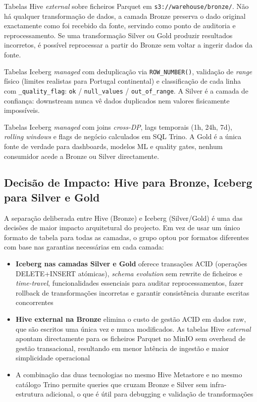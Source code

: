\documentclass[11pt,a4paper]{article}
\begin{document}
\begin{description}[style=nextline,leftmargin=0pt,labelwidth=0pt]
  \item[\textbf{Bronze}] Tabelas Hive \textit{external} sobre ficheiros Parquet em \texttt{s3://warehouse/bronze/}. Não há qualquer transformação de dados, a camada Bronze preserva o dado original exactamente como foi recebido da fonte, servindo como ponto de auditoria e reprocessamento. Se uma transformação Silver ou Gold produzir resultados incorretos, é possível reprocessar a partir do Bronze sem voltar a ingerir dados da fonte.
  \item[\textbf{Silver}] Tabelas Iceberg \textit{managed} com deduplicação via \texttt{ROW\_NUMBER()}, validação de \textit{range} físico (limites realistas para Portugal continental) e classificação de cada linha com \texttt{\_quality\_flag}: \texttt{ok} / \texttt{null\_values} / \texttt{out\_of\_range}. A Silver é a camada de confiança: downstream nunca vê dados duplicados nem valores fisicamente impossíveis.
  \item[\textbf{Gold}] Tabelas Iceberg \textit{managed} com joins \textit{cross-DP}, lags temporais (1h, 24h, 7d), \textit{rolling windows} e flags de negócio calculados em SQL Trino. A Gold é a única fonte de verdade para dashboards, modelos ML e quality gates, nenhum consumidor acede a Bronze ou Silver directamente.
\end{description}

\subsection{Decisão de Impacto: Hive para Bronze, Iceberg para Silver e Gold}

A separação deliberada entre Hive (Bronze) e Iceberg (Silver/Gold) é uma das decisões de maior impacto arquitetural do projecto. Em vez de usar um único formato de tabela para todas as camadas, o grupo optou por formatos diferentes com base nas garantias necessárias em cada camada:

\begin{itemize}[leftmargin=*,noitemsep]
  \item \textbf{Iceberg nas camadas Silver e Gold} oferece transações ACID (operações DELETE+INSERT atómicas), \textit{schema evolution} sem rewrite de ficheiros e \textit{time-travel}, funcionalidades essenciais para auditar reprocessamentos, fazer rollback de transformações incorretas e garantir consistência durante escritas concorrentes
  \item \textbf{Hive external na Bronze} elimina o custo de gestão ACID em dados raw, que são escritos uma única vez e nunca modificados. As tabelas Hive \textit{external} apontam directamente para os ficheiros Parquet no MinIO sem overhead de gestão transacional, resultando em menor latência de ingestão e maior simplicidade operacional
  \item A combinação das duas tecnologias no mesmo Hive Metastore e no mesmo catálogo Trino permite queries que cruzam Bronze e Silver sem infra-estrutura adicional, o que é útil para debugging e validação de transformações
\end{itemize}
\end{document}
